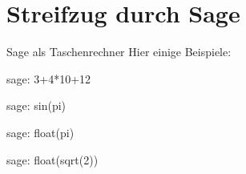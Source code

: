 \documentclass[notes=hide,hyperref={dvipdfmx,pdfpagelabels=false}]{beamer}
\begin{document}



\section{Streifzug durch Sage}


\begin{frame}[fragile]{Sage als Taschenrechner}
Hier einige Beispiele: 
\begin{sagecommandline}
sage: 3+4*10+12 
\end{sagecommandline}
\begin{sagecommandline}
sage: sin(pi) 
\end{sagecommandline}
\begin{sagecommandline}
sage: float(pi)
\end{sagecommandline}
\begin{sagecommandline}
sage: float(sqrt(2))
\end{sagecommandline}
\end{frame}
\end{document}
